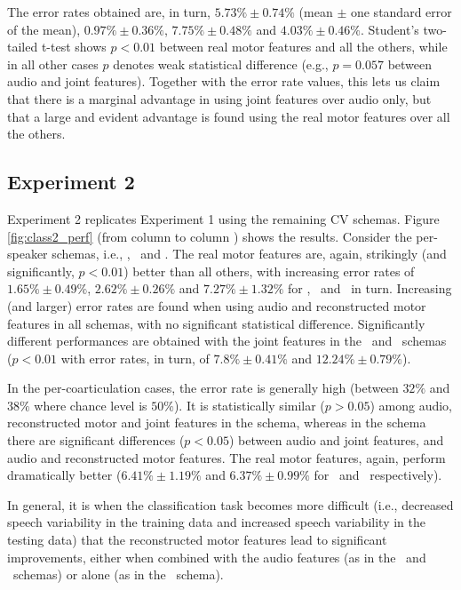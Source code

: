 The error rates obtained are, in turn,
$5.73\% \pm 0.74\%$ (mean $\pm$ one standard error of the mean),
$0.97\% \pm 0.36\%$,
$7.75\% \pm 0.48\%$ and
$4.03\% \pm 0.46\%$. Student's two-tailed t-test shows $p<0.01$ between real motor features
and all the others, while in all other cases $p$ denotes weak statistical difference (e.g.,
$p=0.057$ between audio and joint features). Together with the error rate values, this lets
us claim that there is a marginal advantage in using joint features
over audio only, but that a large and evident advantage is found using the real motor features
over all the others.

\subsection{Experiment 2}
\label{subsec:exp2}

Experiment 2 replicates Experiment 1 using the remaining CV schemas.
Figure \ref{fig:class2_perf} (from column \spka to column \cob) shows the results.
Consider the per-speaker schemas, i.e., \spka, \spkb\ and \spkc. The real motor
features are, again, strikingly (and significantly, $p<0.01$) better than all others,
with increasing error rates of
$1.65\% \pm 0.49\%$,
$2.62\% \pm 0.26\%$ and
$7.27\% \pm 1.32\%$ for \spka, \spkb\ and \spkc\ in turn. Increasing (and larger) error
rates are found when using audio and reconstructed motor features in all schemas, with
no significant statistical difference. Significantly different performances are obtained
with the joint features in the \spkb\ and \spkc\ schemas ($p<0.01$ with error rates, in turn,
of $7.8\% \pm 0.41\%$ and $12.24\% \pm 0.79\%$).

In the per-coarticulation cases, the error rate is generally high (between $32\%$ and $38\%$
where chance level is $50\%$). It is statistically similar ($p>0.05$) among audio, reconstructed
motor and joint features in the \coa schema, whereas in the \cob schema there are significant 
differences ($p<0.05$) between audio and joint features, and audio and reconstructed motor features.
The real motor features, again, perform dramatically better
($6.41\% \pm 1.19\%$ and $6.37\% \pm 0.99\%$ for \coa\ and \cob\ respectively).

In general, it is when the classification task becomes more difficult (i.e., decreased speech variability in the 
 training data and increased speech variability in the testing data) that the reconstructed motor features 
lead to significant improvements, either when combined with the audio features (as in the \spkb\ and \spkc\ 
schemas) or alone (as in the \cob\ schema).

